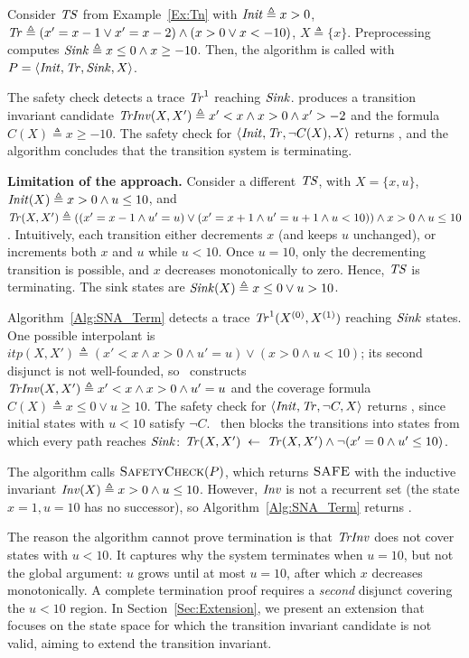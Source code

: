 \begin{example}
    Consider $\mathit{TS}$ from Example~\ref{Ex:Tn} with 
    $\mathit{Init} \triangleq x > 0$, 
    $\mathit{Tr} \triangleq (x'=x-1 \lor x'=x-2) \land (x>0 \lor x<-10)$, 
    $X \triangleq \{x\}$.
    Preprocessing computes 
    $\mathit{Sink} \triangleq x \leq 0 \land x \geq -10$.
    Then, the algorithm is called with $P=\langle \mathit{Init}, \mathit{Tr}, \mathit{Sink}, X \rangle$.


    The safety check detects a trace $\mathit{Tr}^1$ reaching $\mathit{Sink}$. 
    \trInvSynthesis produces a transition invariant candidate $\mathit{TrInv}(X,X') \triangleq x' < x \land x > 0 \land x' > -2$ 
    and the formula $C(X) \triangleq  x \geq -10$.
    The safety check for $\langle \mathit{Init}, \mathit{Tr}, \lnot C(X), X \rangle$ returns \SAFE, and the algorithm concludes 
    that the transition system is terminating.

    \textbf{Limitation of the approach.} Consider a different $\mathit{TS}$,
    with $X = \{x, u\}$, $\mathit{Init}(X) \triangleq x > 0 \land u \leq 10$, and
    $\mathit{Tr}(X, X') \triangleq ((x' = x - 1 \land u' = u) \lor (x' = x + 1 \land u' = u + 1 \land u < 10)) \land x > 0 \land u \leq 10$.
    Intuitively, each transition either decrements $x$ (and keeps $u$ unchanged), or
    increments both $x$ and $u$ while $u < 10$.
    Once $u = 10$, only the decrementing transition is possible, and $x$ decreases monotonically to zero.
    Hence, $\mathit{TS}$ is terminating.
    The sink states are $\mathit{Sink}(X) \triangleq x \leq 0 \lor u > 10$.

    Algorithm~\ref{Alg:SNA_Term} detects a trace $\mathit{Tr}^1(X^{(0)}, X^{(1)})$ reaching $\mathit{Sink}$ states.
    One possible interpolant is $itp(X,X') \triangleq (x' < x \land x > 0 \land u' = u) \lor (x > 0 \land u < 10)$;
    its second disjunct is not well-founded, so \trInvSynthesis\ constructs
    $\mathit{TrInv}(X, X') \triangleq x' < x \land x > 0 \land u' = u$
    and the coverage formula $C(X) \triangleq x \leq 0 \lor u \geq 10$.
    The safety check for $\langle \mathit{Init}, \mathit{Tr}, \lnot C, X \rangle$ returns \UNSAFE, since initial states
    with $u < 10$ satisfy $\lnot C$.
    \blockTerm\ then blocks the transitions into states from which every path reaches $\mathit{Sink}$:
    $\mathit{Tr}(X, X') \;\gets\; \mathit{Tr}(X, X') \land \lnot(x' = 0 \land u' \leq 10)$.

    The algorithm calls $\textsc{SafetyCheck}(P)$, which returns $\textsc{SAFE}$ with the inductive invariant
    $\mathit{Inv}(X) \triangleq x > 0 \land u \leq 10$.
    However, $\mathit{Inv}$ is not a recurrent set (the state $x = 1, u = 10$ has no successor),
    so Algorithm~\ref{Alg:SNA_Term} returns \UNKNOWN.

    The reason the algorithm cannot prove termination is that $\mathit{TrInv}$ does
    not cover states with $u < 10$. 
    It captures why the system terminates when $u = 10$, but not the global argument: $u$ 
    grows until at most $u = 10$, after which $x$ decreases monotonically. 
    A complete termination proof requires a \emph{second} disjunct covering the $u < 10$ region.
    In Section~\ref{Sec:Extension}, we present an extension that focuses on the state space
    for which the transition invariant candidate is not valid, aiming to extend the transition invariant.
\end{example}

